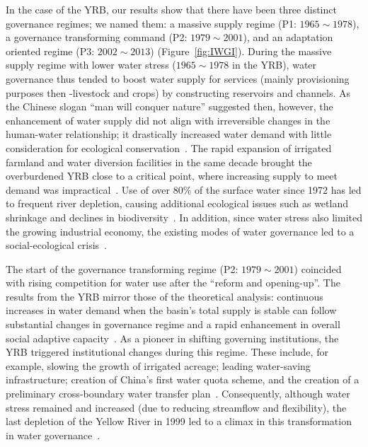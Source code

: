\documentclass[draft]{../agujournal2019}
\begin{document}
In the case of the YRB, our results show that there have been three distinct governance regimes; we named them: a massive supply regime (P1: $1965 \sim 1978$), a governance transforming command (P2: $1979 \sim 2001$), and an adaptation oriented regime (P3: $2002 \sim 2013$) (Figure~\ref{fig:IWGI}).
During the massive supply regime with lower water stress ($1965 \sim 1978$ in the YRB), water governance thus tended to boost water supply for services (mainly provisioning purposes then -livestock and crops) by constructing reservoirs and channels.
As the Chinese slogan ``man will conquer nature'' suggested then, however, the enhancement of water supply did not align with irreversible changes in the human-water relationship; it drastically increased water demand with little consideration for ecological conservation~\cite{zhou2020}.
The rapid expansion of irrigated farmland and water diversion facilities in the same decade brought the overburdened YRB close to a critical point, where increasing supply to meet demand was impractical~\cite{loch2020}.
Use of over $80\%$ of the surface water since 1972 has led to frequent river depletion, causing additional ecological issues such as wetland shrinkage and declines in biodiversity~\cite{wang2019c}.
In addition, since water stress also limited the growing industrial economy, the existing modes of water governance led to a social-ecological crisis~\cite{wohlfart2016a}.

The start of the governance transforming regime (P2: $1979 \sim 2001$) coincided with rising competition for water use after the ``reform and opening-up''.
The results from the YRB mirror those of the theoretical analysis: continuous increases in water demand when the basin's total supply is stable can follow substantial changes in governance regime and a rapid enhancement in overall social adaptive capacity~\cite{loch2020}.
As a pioneer in shifting governing institutions, the YRB triggered institutional changes during this regime. These include, for example, slowing the growth of irrigated acreage; leading water-saving infrastructure; creation of China's first water quota scheme, and the creation of a preliminary cross-boundary water transfer plan~\cite{wang2019e,long2020,nickum2021}.
Consequently, although water stress remained and increased (due to reducing streamflow and flexibility), the last depletion of the Yellow River in 1999 led to a climax in this transformation in water governance~\cite{wang2019e}.
\end{document}
